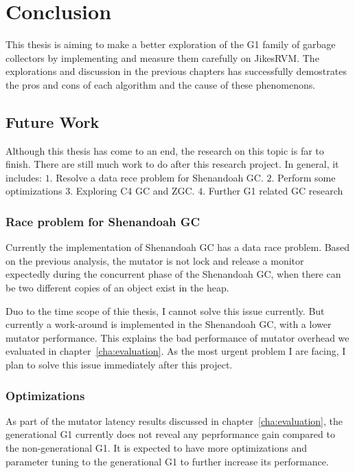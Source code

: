 \chapter{Conclusion}
\label{cha:conc}

This thesis is aiming to make a better exploration of the G1 family of garbage collectors
by implementing and measure them carefully on JikesRVM.
The explorations and discussion in the previous chapters has successfully demostrates
the pros and cons of each algorithm and the cause of these phenomenons.

\section{Future Work}
\label{sec:future}

Although this thesis has come to an end, the research on this topic is far to finish.
There are still much work to do after this research project. In general, it includes:
$1.$ Resolve a data rece problem for Shenandoah GC.
$2.$ Perform some optimizations
$3.$ Exploring C4 GC and ZGC.
$4.$ Further G1 related GC research

\subsection{Race problem for Shenandoah GC}

Currently the implementation of Shenandoah GC has a data race problem.
Based on the previous analysis, the mutator is not lock and release a monitor
expectedly during the concurrent phase of the Shenandoah GC, when there can be
two different copies of an object exist in the heap.

Duo to the time scope of thie thesis, I cannot solve this issue currently.
But currently a work-around is implemented in the Shenandoah GC, with a lower mutator performance.
This explains the bad performance of mutator overhead we evaluated in chapter~\ref{cha:evaluation}.
As the most urgent problem I are facing, I plan to solve this issue immediately after
this project.

\subsection{Optimizations}

As part of the mutator latency results discussed in chapter~\ref{cha:evaluation},
the generational G1 currently does not reveal any peprformance gain compared to
the non-generational G1. It is expected to have more optimizations and parameter
tuning to the generational G1 to further increase its performance.

